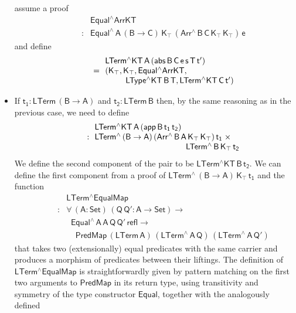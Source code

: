 \documentclass[sigplan,10pt]{acmart}
\begin{document}
\begin{itemize}
assume a proof \[\begin{array}{ll}
&\!\! \mathsf{Equal^\wedge ArrKT}\\
\quad\quad  : & \!\!\mathsf{Equal^{\wedge} \, A\, (B
  \to C)\, K_\top\, (Arr^{\wedge} \, B\, C\, K_\top \, K_\top)\, e}
\end{array}\]
and define
\[\begin{array}{ll}
 & \!\!\mathsf{LTerm^\wedge KT\,A\, (abs\, B \,C \, e \,s \,T \,
  t')}\\
\quad\quad= & \!\!\mathsf{(K_\top , K_\top , Equal^\wedge ArrKT ,}\\
 & \hspace*{0.3in} \mathsf{LType^\wedge KT\, B\, T , LTerm^\wedge KT\, C\, t') }
\end{array}\]
\item If $\mathsf{t_1 : LTerm\,(B \to A)}$ and $\mathsf{t_2 :
  LTerm\,B}$ then, by the same reasoning as in the previous case, we
  need to define
  \[\begin{array}{ll}
 & \!\! \mathsf{LTerm^\wedge KT\,A\, (app\, B \, t_1\,t_2)}\\
\quad\quad : &\!\! \mathsf{LTerm^{\wedge}\, (B \to A)\, (Arr^{\wedge} \, B\, A\,
  K_\top \, K_\top)\, t_1\; \times}\\
 & \hspace*{1.5in} \mathsf{LTerm^{\wedge}\, B\, K_\top\, t_2}
  \end{array}\]
  We define the second component of the pair to be
  $\mathsf{LTerm^\wedge KT\,B\,t_2}$. We can define the first
  component from a proof of $\mathsf{LTerm^{\wedge}\, (B \to A)\,
    K_\top\, t_1}$ and the function
  \[\begin{array}{ll}
  & \!\! \mathsf{LTerm^\wedge EqualMap}\\
  \quad\quad : &
  \!\!\mathsf{\forall\, (A : Set)\, (Q\,Q' : A \to
    Set) \to}\\
  & \;\;\mathsf{Equal^\wedge\,A\,A\,Q\,Q'\,refl \to}\\
  &  \;\;\;\;\mathsf{PredMap\,(LTerm\,A)\,
    (LTerm^{\wedge}\,A\,Q)\,(LTerm^{\wedge}\,A\,Q')}
  \end{array}\] that takes two
  (extensionally) equal predicates with the same carrier and produces
  a morphism of predicates between their liftings. The definition of
  $\mathsf{LTerm^\wedge EqualMap}$ is straightforwardly given by
  pattern matching on the first two arguments to $\mathsf{PredMap}$ in
  its return type, using transitivity and symmetry of the type
  constructor $\mathsf{Equal}$, together with the analogously defined

\end{itemize}
\end{document}
